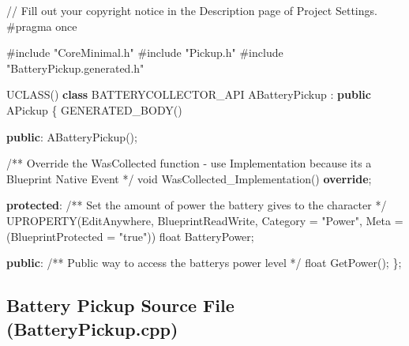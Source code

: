 \documentclass[
  letterpaper,
  DIV=11,
  numbers=noendperiod]{scrartcl}
\newenvironment{Shaded}{\begin{snugshade}}{\end{snugshade}}
\newcommand{\CommentTok}[1]{\textcolor[rgb]{0.37,0.37,0.37}{#1}}
\newcommand{\DataTypeTok}[1]{\textcolor[rgb]{0.68,0.00,0.00}{#1}}
\newcommand{\ImportTok}[1]{\textcolor[rgb]{0.00,0.46,0.62}{#1}}
\newcommand{\KeywordTok}[1]{\textcolor[rgb]{0.00,0.23,0.31}{\textbf{#1}}}
\newcommand{\NormalTok}[1]{\textcolor[rgb]{0.00,0.23,0.31}{#1}}
\newcommand{\OperatorTok}[1]{\textcolor[rgb]{0.37,0.37,0.37}{#1}}
\newcommand{\PreprocessorTok}[1]{\textcolor[rgb]{0.68,0.00,0.00}{#1}}
\newcommand{\StringTok}[1]{\textcolor[rgb]{0.13,0.47,0.30}{#1}}
\begin{document}
\begin{Shaded}
\begin{Highlighting}[]
\CommentTok{// Fill out your copyright notice in the Description page of Project Settings.}
\PreprocessorTok{\#pragma once}

\PreprocessorTok{\#include }\ImportTok{"CoreMinimal.h"}
\PreprocessorTok{\#include }\ImportTok{"Pickup.h"}
\PreprocessorTok{\#include }\ImportTok{"BatteryPickup.generated.h"}

\NormalTok{UCLASS}\OperatorTok{()}
\KeywordTok{class}\NormalTok{ BATTERYCOLLECTOR\_API ABatteryPickup }\OperatorTok{:} \KeywordTok{public}\NormalTok{ APickup}
\OperatorTok{\{}
\NormalTok{    GENERATED\_BODY}\OperatorTok{()}

\KeywordTok{public}\OperatorTok{:}
\NormalTok{    ABatteryPickup}\OperatorTok{();}
    
    \CommentTok{/** Override the WasCollected function {-} use Implementation because it\textquotesingle{}s a Blueprint Native Event */}
    \DataTypeTok{void}\NormalTok{ WasCollected\_Implementation}\OperatorTok{()} \KeywordTok{override}\OperatorTok{;}

\KeywordTok{protected}\OperatorTok{:}
    \CommentTok{/** Set the amount of power the battery gives to the character */}
\NormalTok{    UPROPERTY}\OperatorTok{(}\NormalTok{EditAnywhere}\OperatorTok{,}\NormalTok{ BlueprintReadWrite}\OperatorTok{,}\NormalTok{ Category }\OperatorTok{=} \StringTok{"Power"}\OperatorTok{,}\NormalTok{ Meta }\OperatorTok{=} \OperatorTok{(}\NormalTok{BlueprintProtected }\OperatorTok{=} \StringTok{"true"}\OperatorTok{))}
    \DataTypeTok{float}\NormalTok{ BatteryPower}\OperatorTok{;}
    
\KeywordTok{public}\OperatorTok{:}
    \CommentTok{/** Public way to access the battery\textquotesingle{}s power level */}
    \DataTypeTok{float}\NormalTok{ GetPower}\OperatorTok{();}
\OperatorTok{\};}
\end{Highlighting}
\end{Shaded}

\subsection{Battery Pickup Source File
(BatteryPickup.cpp)}\label{battery-pickup-source-file-batterypickup.cpp}
\end{document}
